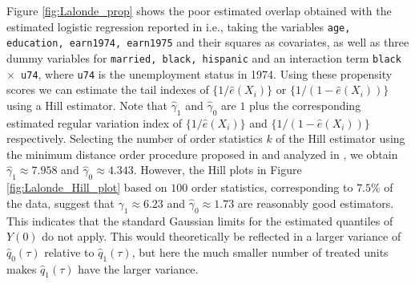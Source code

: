 \documentclass[12pt]{amsart}
\newcommand{\1}{\mathbbm{1}}
\newcommand{\0}{\mathbf{0}}
\theoremstyle{plain}
\theoremstyle{definition}
\begin{document}
Figure \ref{fig:Lalonde_prop} shows the poor estimated overlap obtained with the estimated logistic regression reported in \cite{ma:wang2020} i.e., taking the variables \texttt{age, education, earn1974, earn1975}  and their squares as covariates, 
 as well as three dummy variables 
 for \texttt{married, black, hispanic} and an interaction term \texttt{black $\times$ u74}, where \texttt{u74} is the unemployment status in 1974. Using these propensity scores we can estimate the tail indexes of  $\{1/\hat{e}(X_i)\}$ or $\{1/(1-\hat{e}(X_i))\}$ using a Hill estimator. Note that $\hat\gamma_1$ and $\hat\gamma_0$ are $1$ plus the corresponding estimated regular variation index of $\{1/\hat{e}(X_i)\}$ and $\{1/(1-\hat{e}(X_i))\}$  respectively. Selecting the number of order statistics $k$ of the Hill estimator using  the minimum distance order procedure proposed in \cite{clauset:shalizi:newman2009} and analyzed in \cite{drees:janssen:resnick:wang2020}, we obtain $\hat{\gamma}_1\approx 7.958$ and $\hat{\gamma}_0\approx 4.343$. However, the Hill plots in Figure \ref{fig:Lalonde_Hill_plot} based on $100$ order statistics, corresponding to $7.5$\% of the data, suggest  that $\hat\gamma_1\approx 6.23$ and $\hat\gamma_0\approx1.73$ are reasonably good estimators. This indicates that the standard Gaussian limits for the estimated quantiles of $Y(0)$ do not apply. This would theoretically be reflected in a larger variance of $\hat{q}_0(\tau)$ relative to $\hat{q}_1(\tau)$, but  here the much smaller number of treated units makes $\hat{q}_1(\tau)$ have the larger variance.  
\end{document}
